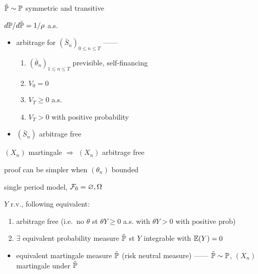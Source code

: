 \begin{fact}
    $\tilde {\mathbb{P}} \sim \mathbb{P}$ symmetric and transitive
\end{fact}

\begin{fact}
    $d\mathbb{P}/d\tilde{\mathbb{P}} = 1/\rho$ a.s.\
\end{fact}

\begin{itemize}
    \item arbitrage for $(\bar S_n)_{0\leq n \leq T}$ ------
    \begin{enumerate}
        \item $(\bar\theta_n)_{1 \leq n \leq T}$ previsible, self-financing
        \item $V_0 = 0$
        \item $V_T \geq 0$ a.s.
        \item $V_T > 0$ with positive probability
    \end{enumerate}
\end{itemize}

\begin{itemize}
    \item $(\bar S_n)$ arbitrage free
\end{itemize}

\begin{prop}
    $(X_n)$ martingale $\Rightarrow$ $(X_n)$ arbitrage free
\end{prop}

\begin{fact}
    proof can be simpler when $(\theta_n)$ bounded
\end{fact}

\begin{setting}
    single period model, $\mathcal{F}_0 = {\varnothing, \Omega}$
\end{setting}

\begin{prop}
    $Y$ r.v., following equivalent:
    \begin{enumerate}
        \item arbitrage free (i.e.\ no $\theta$ st $\theta Y \geq 0$ a.s. with $\theta Y > 0$ with positive prob)
        \item $\exists$ equivalent probability measure $\tilde {\mathbb{P}}$ st $Y$ integrable with $\mathbb{E}(Y) = 0$
    \end{enumerate}
\end{prop}

\begin{itemize}
    \item equivalent martingale measure $\tilde {\mathbb{P}}$ (risk neutral measure) ------ $\tilde {\mathbb{P}} \sim \mathbb{P}$, $(X_n)$ martingale under $\tilde {\mathbb{P}}$
\end{itemize}

